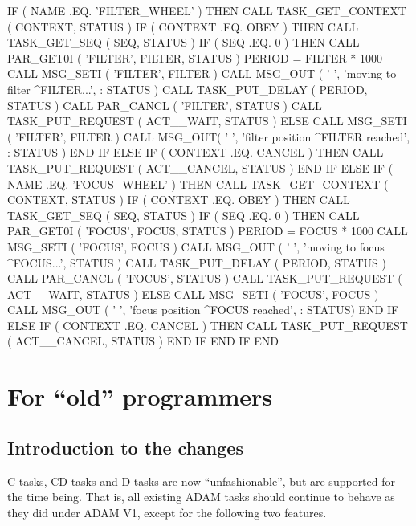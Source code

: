 \documentclass[twoside,11pt,nolof]{starlink}
\begin{document}
\begin{small}
\begin{terminalv}
      IF ( NAME .EQ. 'FILTER_WHEEL' ) THEN
         CALL TASK_GET_CONTEXT ( CONTEXT, STATUS )
         IF ( CONTEXT .EQ. OBEY ) THEN
            CALL TASK_GET_SEQ ( SEQ, STATUS )
            IF ( SEQ .EQ. 0 ) THEN
               CALL PAR_GET0I ( 'FILTER', FILTER, STATUS )
               PERIOD = FILTER * 1000
               CALL MSG_SETI ( 'FILTER', FILTER )
               CALL MSG_OUT ( ' ', 'moving to filter ^FILTER...',
     :           STATUS )
               CALL TASK_PUT_DELAY ( PERIOD, STATUS )
               CALL PAR_CANCL ( 'FILTER', STATUS )
               CALL TASK_PUT_REQUEST ( ACT__WAIT, STATUS )
            ELSE
               CALL MSG_SETI ( 'FILTER', FILTER )
               CALL MSG_OUT( ' ', 'filter position ^FILTER reached',
     :           STATUS )
            END IF
         ELSE IF ( CONTEXT .EQ. CANCEL ) THEN
            CALL TASK_PUT_REQUEST ( ACT__CANCEL, STATUS )
         END IF
      ELSE IF ( NAME .EQ. 'FOCUS_WHEEL' ) THEN
         CALL TASK_GET_CONTEXT ( CONTEXT, STATUS )
         IF ( CONTEXT .EQ. OBEY ) THEN
            CALL TASK_GET_SEQ ( SEQ, STATUS )
            IF ( SEQ .EQ. 0 ) THEN
               CALL PAR_GET0I ( 'FOCUS', FOCUS, STATUS )
               PERIOD = FOCUS * 1000
               CALL MSG_SETI ( 'FOCUS', FOCUS )
               CALL MSG_OUT ( ' ', 'moving to focus ^FOCUS...', STATUS )
               CALL TASK_PUT_DELAY ( PERIOD, STATUS )
               CALL PAR_CANCL ( 'FOCUS', STATUS )
               CALL TASK_PUT_REQUEST ( ACT__WAIT, STATUS )
            ELSE
               CALL MSG_SETI ( 'FOCUS', FOCUS )
               CALL MSG_OUT ( ' ', 'focus position ^FOCUS reached',
     :           STATUS)
            END IF
         ELSE IF ( CONTEXT .EQ. CANCEL ) THEN
            CALL TASK_PUT_REQUEST ( ACT__CANCEL, STATUS )
         END IF
      END IF
      END
\end{terminalv}
\end{small}

\newpage

\section{\label{old}For ``old'' programmers}

\subsection{Introduction to the changes}

C-tasks, CD-tasks and D-tasks are now ``unfashionable'', but are supported
for the time being. That is, all existing ADAM tasks should continue to
behave as they did under ADAM V1, except for the following two features.
\end{document}
